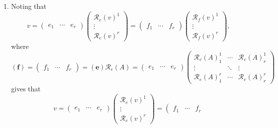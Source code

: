 \documentclass[aps,preprint]{revtex4}
\begin{document}
\begin{enumerate}
\item Noting that%
\begin{equation}
v=\left( 
\begin{array}{ccc}
e_{1} & \cdots & e_{r}%
\end{array}%
\right) \left( 
\begin{array}{c}
\mathcal{R}_{e}\left( v\right) ^{1} \\ 
\vdots \\ 
\mathcal{R}_{e}\left( v\right) ^{r}%
\end{array}%
\right) =\left( 
\begin{array}{ccc}
f_{1} & \cdots & f_{r}%
\end{array}%
\right) \left( 
\begin{array}{c}
\mathcal{R}_{f}\left( v\right) ^{1} \\ 
\vdots \\ 
\mathcal{R}_{f}\left( v\right) ^{r}%
\end{array}%
\right) ,
\end{equation}%
where 
\begin{equation}
\left( \boldsymbol{f}\right) =\left( 
\begin{array}{ccc}
f_{1} & \cdots & f_{r}%
\end{array}%
\right) =\left( \boldsymbol{e}\right) \mathcal{R}_{e}\left( A\right) =\left( 
\begin{array}{ccc}
e_{1} & \cdots & e_{r}%
\end{array}%
\right) \left( 
\begin{array}{ccc}
\mathcal{R}_{e}\left( A\right) _{1}^{1} & \cdots & \mathcal{R}_{e}\left(
A\right) _{r}^{1} \\ 
\vdots & \ddots & \vdots \\ 
\mathcal{R}_{e}\left( A\right) _{1}^{r} & \cdots & \mathcal{R}_{e}\left(
A\right) _{r}^{r}%
\end{array}%
\right)
\end{equation}%
gives that 
\begin{equation}
v=\left( 
\begin{array}{ccc}
e_{1} & \cdots & e_{r}%
\end{array}%
\right) \left( 
\begin{array}{c}
\mathcal{R}_{e}\left( v\right) ^{1} \\ 
\vdots \\ 
\mathcal{R}_{e}\left( v\right) ^{r}%
\end{array}%
\right) =\left( 
\begin{array}{ccc}
f_{1} & \cdots & f_{r}%

\end{array}
\end{equation}
\end{enumerate}
\end{document}
